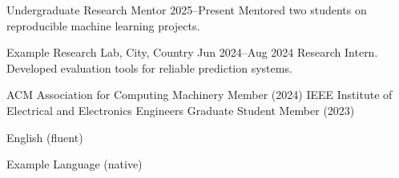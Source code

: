 
\begin{cvrecordlist}
    \cvdateditem
        {Undergraduate Research Mentor}
        {2025--Present}
        {Mentored two students on reproducible machine learning projects.}
\end{cvrecordlist}



\begin{cvrecordlist}
    \cvdateditem
        {Example Research Lab, City, Country}
        {Jun 2024--Aug 2024}
        {Research Intern. Developed evaluation tools for reliable prediction systems.}
\end{cvrecordlist}



\begin{cvrecordlist}
    \cvmembershipitem
        {ACM}
        {Association for Computing Machinery}
        {Member (2024)}
    \cvmembershipitem
        {IEEE}
        {Institute of Electrical and Electronics Engineers}
        {Graduate Student Member (2023)}
\end{cvrecordlist}




\begin{cvregister}
    \item English (fluent)
    \item Example Language (native)
\end{cvregister}


\begin{cvregister}
\end{cvregister}
